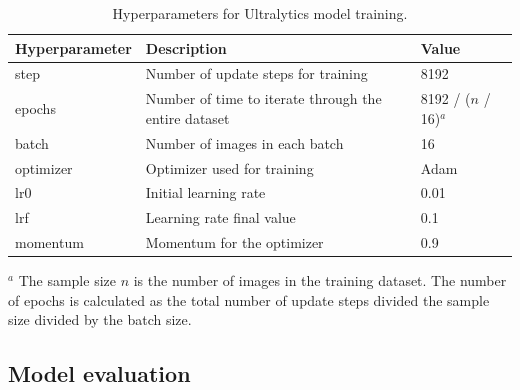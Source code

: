 \begin{table}[h]
    \caption{Hyperparameters for Ultralytics model training.}
    \centering
    \begin{tabular}{lp{}l}
        \toprule
        \textbf{Hyperparameter} & \textbf{Description} & \textbf{Value} \\
        \midrule
        step & Number of update steps for training & 8192 \\
        \midrule
        epochs & Number of time to iterate through the entire dataset & 8192 / ($n$ / 16)$^a$ \\
        \midrule
        batch & Number of images in each batch & 16 \\
        \midrule
        optimizer & Optimizer used for training & Adam \\
        \midrule
        lr0 & Initial learning rate & 0.01 \\
        \midrule
        lrf & Learning rate final value & 0.1 \\
        \midrule
        momentum & Momentum for the optimizer & 0.9 \\
        \bottomrule
    \end{tabular}
    \label{tab:hyperparameters}

    $^a$ The sample size $n$ is the number of images in the training dataset. The number of epochs is calculated as the total number of update steps divided the sample size divided by the batch size.

\end{table}

\subsection*{Model evaluation}

